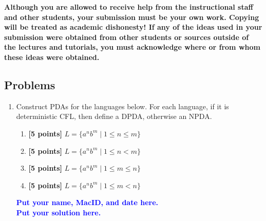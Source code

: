 \documentclass[11pt,fleqn]{article}
\newcommand{\be}{\begin{enumerate}}
\newcommand{\ee}{\end{enumerate}}
\begin{document}
	\textbf{Although you are allowed to receive help from the
		instructional staff and other students, your submission must be your
		own work.  Copying will be treated as academic dishonesty! If any of
		the ideas used in your submission were obtained from other students
		or sources outside of the lectures and tutorials, you must
		acknowledge where or from whom these ideas were obtained.}
	
	\newpage
	
	\subsection*{Problems}
	
	\be
	
	\item  Construct PDAs for the languages below. For each language, if it is deterministic CFL, then define a DPDA, otherwise an NPDA.
	\be
	\item\textbf{[5 points]} $L = \{a^nb^m \mid 1 \le n \le m \}
$
	\item\textbf{[5 points]} $L = \{a^nb^m \mid 1 \le n < m \}$
	\item\textbf{[5 points]} $L = \{a^nb^m \mid 1 \le m \le n \}$
	\item\textbf{[5 points]} $L = \{a^nb^m \mid 1 \le m < n \}$ 
	\ee
	\textcolor{blue}{\textbf{Put your name, MacID, and date here.}}\\
	\textcolor{blue}{\textbf{Put your solution here.}}
	
	\ee
	
\end{document}

